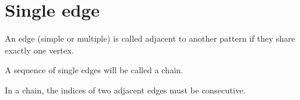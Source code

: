\section{Single edge}

\begin{definition}
  An edge (simple or multiple) is called adjacent to another pattern if they share exactly one vertex.
\end{definition}

\begin{definition}
  A sequence of single edges will be called a chain.
\end{definition}

\begin{proposition}
  \label{chain-consecutive}
  In a chain, the indices of two adjacent edges must be consecutive.
\end{proposition}

